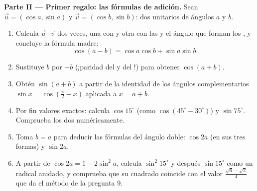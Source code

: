 \begin{problem}
\medskip
\noindent\textbf{Parte II --- Primer regalo: las fórmulas de
adición.}
Sean $\vec u = (\cos a, \sin a)$ y $\vec v = (\cos b, \sin b)$: dos
 unitarios de ángulos $a$ y $b$.
\begin{enumerate}[resume]
  \item Calcula $\vec u \cdot \vec v$ dos veces, una con  y
        otra con las  y el ángulo que forman los , y
        concluye la fórmula madre:
        \[
        \cos(a - b) = \cos a \cos b + \sin a \sin b .
        \]
  \item Sustituye $b$ por $-b$ (¡paridad del  y del !) para
        obtener $\cos(a + b)$.
  \item Obtén $\sin(a + b)$ a partir de la identidad de los ángulos
        complementarios $\sin x = \cos\left(\frac\pi2 - x\right)$ aplicada
        a $x = a + b$.
  \item Por fin valores exactos: calcula $\cos 15^\circ$ (como
        $\cos(45^\circ - 30^\circ)$) y $\sin 75^\circ$. Comprueba los dos
        numéricamente.
  \item Toma $b = a$ para deducir las fórmulas del ángulo doble:
        $\cos 2a$ (en sus tres formas) y $\sin 2a$.
  \item A partir de $\cos 2a = 1 - 2\sin^2 a$, calcula $\sin^2 15^\circ$ y
        después $\sin 15^\circ$ como un radical anidado, y comprueba que
        su cuadrado coincide con el valor $\frac{\sqrt6 - \sqrt2}{4}$ que
        da el método de la pregunta 9.
\end{enumerate}


\end{problem}

